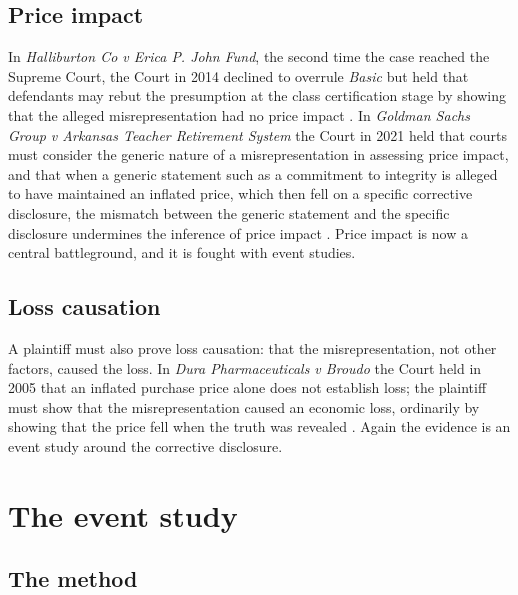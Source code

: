 \subsection{Price impact}

In \emph{Halliburton Co v Erica P. John Fund}, the second time the case reached the Supreme Court, the Court in 2014 declined to overrule \emph{Basic} but held that defendants may rebut the presumption at the class certification stage by showing that the alleged misrepresentation had no price impact \citep{halliburton2014}. In \emph{Goldman Sachs Group v Arkansas Teacher Retirement System} the Court in 2021 held that courts must consider the generic nature of a misrepresentation in assessing price impact, and that when a generic statement such as a commitment to integrity is alleged to have maintained an inflated price, which then fell on a specific corrective disclosure, the mismatch between the generic statement and the specific disclosure undermines the inference of price impact \citep{goldman2021}. Price impact is now a central battleground, and it is fought with event studies.

\subsection{Loss causation}

A plaintiff must also prove loss causation: that the misrepresentation, not other factors, caused the loss. In \emph{Dura Pharmaceuticals v Broudo} the Court held in 2005 that an inflated purchase price alone does not establish loss; the plaintiff must show that the misrepresentation caused an economic loss, ordinarily by showing that the price fell when the truth was revealed \citep{dura2005}. Again the evidence is an event study around the corrective disclosure.

\section{The event study}

\subsection{The method}

